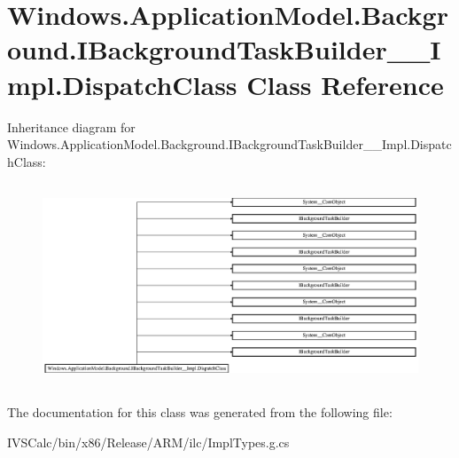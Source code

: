 \hypertarget{class_windows_1_1_application_model_1_1_background_1_1_i_background_task_builder_____impl_1_1_dispatch_class}{}\section{Windows.\+Application\+Model.\+Background.\+I\+Background\+Task\+Builder\+\_\+\+\_\+\+Impl.\+Dispatch\+Class Class Reference}
\label{class_windows_1_1_application_model_1_1_background_1_1_i_background_task_builder_____impl_1_1_dispatch_class}
Inheritance diagram for Windows.\+Application\+Model.\+Background.\+I\+Background\+Task\+Builder\+\_\+\+\_\+\+Impl.\+Dispatch\+Class\+:\begin{figure}[H]
\begin{center}
\leavevmode
\includegraphics[height=6.099010cm]{class_windows_1_1_application_model_1_1_background_1_1_i_background_task_builder_____impl_1_1_dispatch_class}
\end{center}
\end{figure}


The documentation for this class was generated from the following file\+:\begin{DoxyCompactItemize}
\item 
I\+V\+S\+Calc/bin/x86/\+Release/\+A\+R\+M/ilc/Impl\+Types.\+g.\+cs\end{DoxyCompactItemize}
